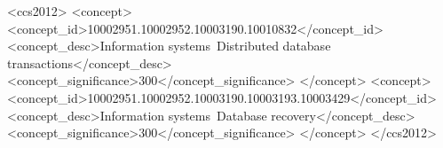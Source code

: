 \documentclass[sigconf]{acmart}
\begin{document}

\author{Weijian Feng}

\author{Mingrun Ma}

\author{Jingyi Jia}


\begin{abstract}

Designing a NoSql distributed databases faces lots of challenges. In this paper we will introduce design methodology via Java of our project. We will also introduce benchmarking tests we have done in order to find out the limitation of database so that it can be further improved.

\end{abstract}

\begin{CCSXML}
<ccs2012>
   <concept>
       <concept_id>10002951.10002952.10003190.10010832</concept_id>
       <concept_desc>Information systems~Distributed database transactions</concept_desc>
       <concept_significance>300</concept_significance>
       </concept>
   <concept>
       <concept_id>10002951.10002952.10003190.10003193.10003429</concept_id>
       <concept_desc>Information systems~Database recovery</concept_desc>
       <concept_significance>300</concept_significance>
       </concept>
 </ccs2012>
\end{CCSXML}
\end{document}
